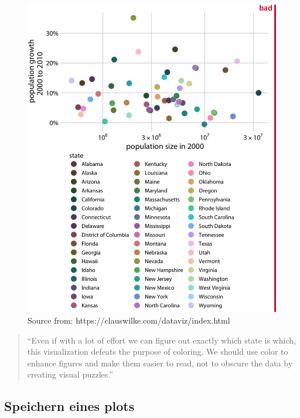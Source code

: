 \documentclass[
]{article}
\begin{document}
\begin{figure}

{\centering \includegraphics[width=1\linewidth]{images/054} 

}

\caption{Source from: https://clauswilke.com/dataviz/index.html}\label{fig:unnamed-chunk-219}
\end{figure}

\begin{quote}
``Even if with a lot of effort we can figure out exactly which state is which, this visualization defeats the purpose of coloring. We should use color to enhance figures and make them easier to read, not to obscure the data by creating visual puzzles.''
\end{quote}

\hypertarget{speichern-eines-plots}{%
\subsection{Speichern eines plots}\label{speichern-eines-plots}}
\end{document}
